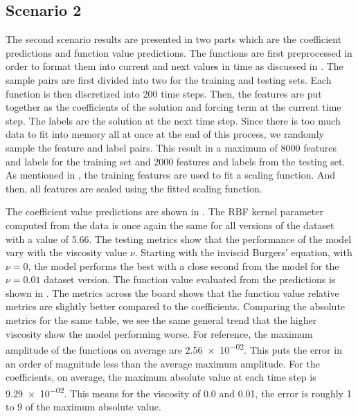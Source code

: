 \subsection{Scenario 2}
\noindent The second scenario results are presented in two parts which are the coefficient predictions and function value predictions. The functions are first preprocessed in order to format them into current and next values in time as discussed in . The sample pairs are first divided into two for the training and testing sets. Each function is then discretized into 200 time steps. Then, the features are put together as the coefficients of the solution and forcing term at the current time step. The labels are the solution at the next time step. Since there is too much data to fit into memory all at once at the end of this process, we randomly sample the feature and label pairs. This result in a maximum of 8000 features and labels for the training set and 2000 features and labels from the testing set. As mentioned in , the training features are used to fit a scaling function. And then, all features are scaled using the fitted scaling function.

The coefficient value predictions are shown in . The RBF kernel parameter computed from the data is once again the same for all versions of the dataset with a value of 5.66. The testing metrics show that the performance of the model vary with the viscosity value \(\nu \). Starting with the inviscid Burgers' equation, with \(\nu=0\), the model performs the best with a close second from the model for the \(\nu = 0.01 \) dataset version. The function value evaluated from the predictions is shown in . The metrics across the board shows that the function value relative metrics are slightly better compared to the coefficients. Comparing the absolute metrics for the same table, we see the same general trend that the higher viscosity show the model performing worse. For reference, the maximum amplitude of the functions on average are \num{2.56e-02}. This puts the error in an order of magnitude less than the average maximum amplitude. For the coefficients, on average, the maximum absolute value at each time step is \num{9.29e-02}. This means for the viscosity of 0.0 and \num{0.01}, the error is roughly 1 to 9 of the maximum absolute value.

